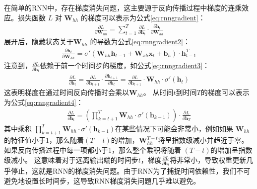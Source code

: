 在简单的RNN中，存在梯度消失问题，这主要源于反向传播过程中梯度的连乘效应\cite{schmidhuber1997long}。损失函数 $L$ 对 $\mathbf{W}_{hh}$ 的梯度可以表示为公式\eqref{eq:rnngradient}：
\begin{align}
  \frac{\partial L}{\partial \mathbf{W}_{hh}} = \sum_{t=1}^{T} \frac{\partial L}{\partial \mathbf{h}_t} \cdot \frac{\partial \mathbf{h}_t}{\partial \mathbf{W}_{hh}} \label{eq:rnngradient}
\end{align}
展开后，隐藏状态关于$\mathbf{W}_{hh}$ 的导数为公式\eqref{eq:rnngradient2}：
\begin{align}
  \frac{\partial \mathbf{h}_t}{\partial \mathbf{W}_{hh}} = \sigma'(\mathbf{W}_{hh} \mathbf{h}_{t-1} + \mathbf{W}_{xh} \mathbf{x}_t + \mathbf{b}_h) \cdot \mathbf{h}_{t-1}^T \label{eq:rnngradient2}
\end{align}
注意到，$\frac{\partial L}{\partial \mathbf{h}_t}$依赖于前一个时间步的梯度，如公式\eqref{eq:rnngradient3}：
\begin{align}
  \frac{\partial L}{\partial \mathbf{h}_t} = \frac{\partial L}{\partial \mathbf{h}_{t+1}} \cdot \frac{\partial \mathbf{h}_{t+1}}{\partial \mathbf{h}_t} = \frac{\partial L}{\partial \mathbf{h}_{t+1}} \cdot \mathbf{W}_{hh} \cdot \sigma'(\mathbf{h}_t) \label{eq:rnngradient3}
\end{align}
这表明梯度在通过时间反向传播时会乘以$\mathbf{W}_{hh}$。
从时间$t$到时间$T$的梯度可以表示为公式\eqref{eq:rnngradient4}：
\begin{align}
  \frac{\partial L}{\partial \mathbf{h}_t} = \left( \prod_{k=t+1}^{T} \mathbf{W}_{hh} \cdot \sigma'(\mathbf{h}_{k-1}) \right) \cdot \frac{\partial L}{\partial \mathbf{h}_T} \label{eq:rnngradient4}
\end{align}
其中乘积 $\prod_{k=t+1}^{T} \mathbf{W}_{hh} \cdot \sigma'(\mathbf{h}_{k-1})$在某些情况下可能会非常小，例如如果 $\mathbf{W}_{hh}$的特征值小于1，那么随着$(T - t)$的增加，$\mathbf{W}_{hh}^{T-t}$将呈指数级减小并趋近于零。
如果反向传播过程中每一项都小于1，那么整个乘积将随着 $(T - t)$的增加呈指数级减小。
这意味着对于远离输出端的时间步$t$，梯度$\frac{\partial L}{\partial \mathbf{h}_t}$将非常小，导致权重更新几乎停止，这就是RNN的梯度消失问题。由于RNN为了捕捉时间依赖性，我们不可避免地设置长时间步，这导致RNN梯度消失问题几乎难以避免。

